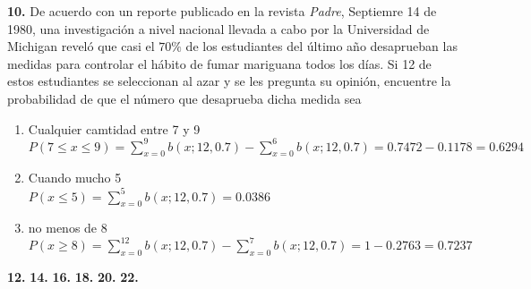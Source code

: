 \documentclass[12pt, letterpaper]{article}
\begin{document}
    \textbf{10. }De acuerdo con un reporte publicado en la revista \textit{Padre}, Septiemre 14 de 1980, una investigación
    a nivel nacional llevada a cabo por la Universidad de Michigan reveló que casi el $70\%$ de los estudiantes del
    último año desaprueban las medidas para controlar el hábito de fumar mariguana todos los días. Si 12 de estos
    estudiantes se seleccionan al azar y se les pregunta su opinión, encuentre la probabilidad de que el número que
    desaprueba dicha medida sea
    \begin{enumerate}
        \item Cualquier camtidad entre 7 y 9\\
            $P(7\leq x\leq 9)=\displaystyle\sum_{x=0}^{9}b(x;12,0.7)-\sum_{x=0}^{6}b(x;12,0.7)=0.7472-0.1178=0.6294$
        \item Cuando mucho 5\\
            $P(x\leq 5)=\displaystyle\sum_{x=0}^{5}b(x;12,0.7)=0.0386$
        \item no menos de 8\\
            $P(x\geq 8)=\displaystyle\sum_{x=0}^{12}b(x;12,0.7)-\sum_{x=0}^{7}b(x;12,0.7)=1-0.2763=0.7237$
    \end{enumerate}\vskip1cm

    \textbf{12. }\vskip1cm
    \textbf{14. }\vskip1cm
    \textbf{16. }\vskip1cm
    \textbf{18. }\vskip1cm
    \textbf{20. }\vskip1cm
    \textbf{22. }\vskip1cm
\end{document}
